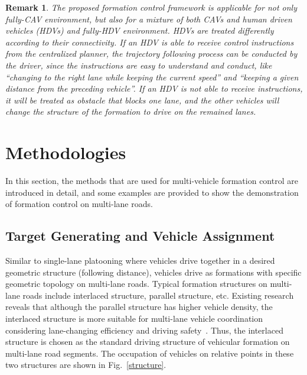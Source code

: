 \documentclass[journal]{IEEEtranTIE}
\newtheorem{remark}{Remark}
\begin{document}
\begin{remark}
The proposed formation control framework is applicable for not only fully-CAV environment, but also for a mixture of both CAVs and human driven vehicles (HDVs) and fully-HDV environment. HDVs are treated differently according to their connectivity. If an HDV is able to receive control instructions from the centralized planner, the trajectory following process can be conducted by the driver, since the instructions are easy to understand and conduct, like ``changing to the right lane while keeping the current speed'' and ``keeping a given distance from the preceding vehicle''. If an HDV is not able to receive instructions, it will be treated as obstacle that blocks one lane, and the other vehicles will change the structure of the formation to drive on the remained lanes.
\end{remark}





%
\section{Methodologies}
\label{method}
%

In this section, the methods that are used for multi-vehicle formation control are introduced in detail, and some examples are provided to show the demonstration of formation control on multi-lane roads.



%
\subsection{Target Generating and Vehicle Assignment}
\label{targetgenerating}
%

Similar to single-lane platooning where vehicles drive together in a desired geometric structure (following distance), vehicles drive as formations with specific geometric topology on multi-lane roads. Typical formation structures on multi-lane roads include interlaced structure, parallel structure, etc. Existing research reveals that although the parallel structure has higher vehicle density, the interlaced structure is more suitable for multi-lane vehicle coordination considering lane-changing efficiency and driving safety~\cite{marjovi2015distributed, cai2019multi}. Thus, the interlaced structure is chosen as the standard driving structure of vehicular formation on multi-lane road segments. The occupation of vehicles on relative points in these two structures are shown in Fig.~\ref{structure}.
\end{document}
